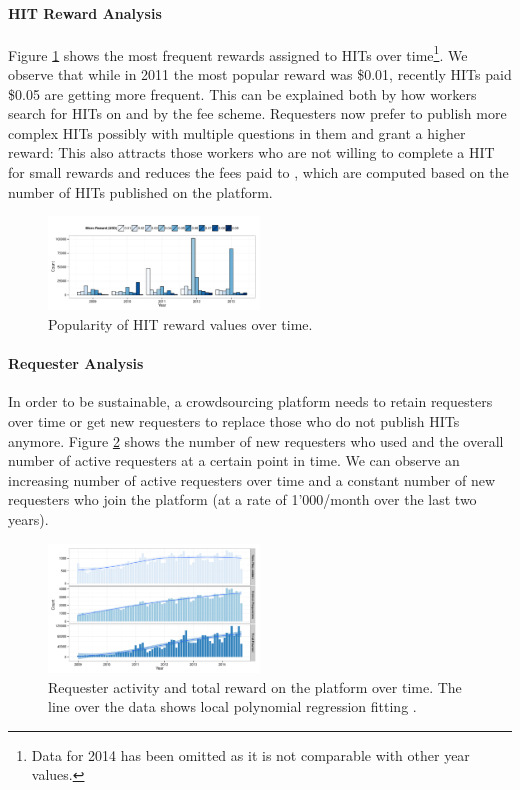 \paragraph{HIT Reward Analysis}
Figure \ref{fig:reward_year} shows the most frequent rewards assigned to HITs over time\footnote{Data for 2014 has been omitted as it is not comparable with other year values.}. We observe that while in 2011 the most popular reward was \$0.01, recently HITs paid \$0.05 are getting more frequent. This can be explained both by how workers search for HITs on \amt{} and by the \amt{} fee scheme. Requesters now prefer to publish more complex HITs possibly with multiple questions in them and grant a higher reward: This also attracts those workers who are not willing to complete a HIT for small rewards and reduces the fees paid to \amt{}, which are computed based on the number of HITs published on the platform.

\begin{figure}[tb]
	\centering
		\includegraphics[width=0.5\textwidth]{figures/reward_year}
	\caption{Popularity of HIT reward values over time.}
	\label{fig:reward_year}
\end{figure}



\paragraph{Requester Analysis}
In order to be sustainable, a crowdsourcing platform needs to retain requesters over time or get new requesters to replace those who do not publish HITs anymore. Figure \ref{fig:requesters_reward} shows the number of new requesters who used \amt{} and the overall number of active requesters at a certain point in time. We can observe an increasing number of active requesters over time and a constant number of new requesters who join the platform (at a rate of 1'000/month over the last two years).

\begin{figure}[tb]
	\centering
		\includegraphics[width=0.5\textwidth]{figures/requesters_reward}
	\caption{Requester activity and total reward on the platform over time. The line over the data shows local polynomial regression fitting \cite{cleveland1992local}.}
	\label{fig:requesters_reward}
\end{figure}

